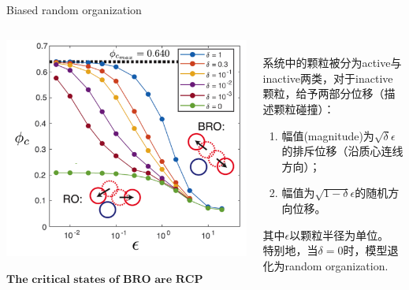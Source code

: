 \documentclass{bredelebeamer}
\begin{document}
\begin{frame}{Biased random organization}

\begin{columns}
\begin{column}{0.5\textwidth}
\centerline{\includegraphics[scale=0.2]{images/p6.png}}
\centerline{$\textbf{The critical states of BRO are RCP configurations.}$}
\end{column}

\begin{column}{0.5\textwidth}
\
\newline\\
\setlength{\parindent}{2em}系统中的颗粒被分为active与inactive两类，对于inactive颗粒，给予两部分位移（描述颗粒碰撞）：
\begin{enumerate}
\item 幅值(magnitude)为$\sqrt{\delta} \epsilon$的排斥位移（沿质心连线方向）；
\item 幅值为$\sqrt{1-\delta} \epsilon$的随机方向位移。
\end{enumerate}
其中$\epsilon$以颗粒半径为单位。
\
\newline\\
特别地，当$\delta=0$时，模型退化为random organization.

\end{column}
\end{columns}
\end{frame}
\end{document}
